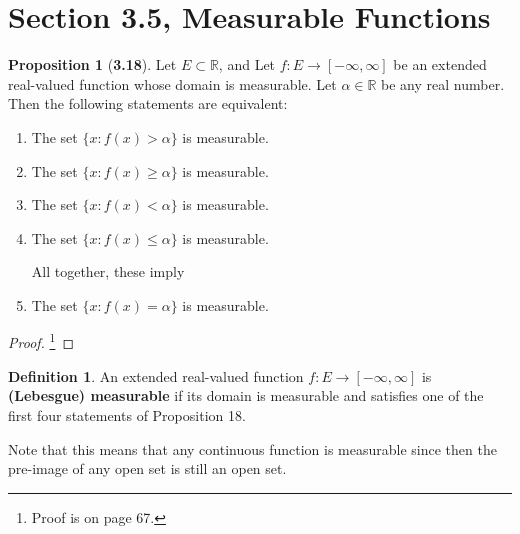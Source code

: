 \documentclass[12pt]{article}
\newcommand{\R}{\mathbb{R}}
\theoremstyle{definition}
\newtheorem*{definition}{Definition}
\newtheorem*{prop}{Proposition}
\begin{document}
\section*{Section 3.5, Measurable Functions}

\begin{prop}[\textbf{3.18}]

    Let \( E \subset \R\), and Let \( f: E \to [-\infty, \infty] \) be an extended real-valued function whose domain is measurable. Let \( \alpha \in \R \) be any real number. Then the following statements are equivalent:

    \begin{enumerate}[label = (\roman{*})]
        
        \item The set \( \{ x: f(x) > \alpha \} \) is measurable.
        \item The set \( \{ x: f(x) \geq \alpha \} \) is measurable. 
        \item The set \( \{ x: f(x) < \alpha \} \) is measurable. 
        \item The set \( \{ x: f(x) \leq \alpha \} \) is measurable. 
        
        \noindent All together, these imply

        \item The set \( \{ x: f(x) = \alpha \} \) is measurable. 
    \end{enumerate}

        \begin{proof}\footnote{Proof is on page 67.}

            
            
        \end{proof}

    
\end{prop}

\begin{definition}
     An extended real-valued function \( f: E \to [-\infty, \infty] \) is \textbf{(Lebesgue) measurable} if its domain is measurable and satisfies one of the first four statements of Proposition 18.
\end{definition}

Note that this means that any continuous function is measurable since then the pre-image of any open set is still an open set. 
\end{document}
